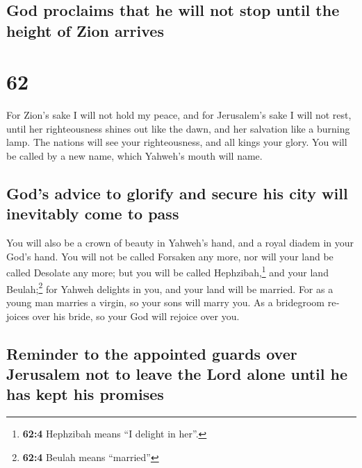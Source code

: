 \begin{paracol}{2}
\begin{otherlanguage}{english}
\hypertarget{god-proclaims-that-he-will-not-stop-until-the-height-of-zion-arrives}{%
\subsection{God proclaims that he will not stop until the height of Zion
arrives}\label{god-proclaims-that-he-will-not-stop-until-the-height-of-zion-arrives}}

\hypertarget{section-123}{%
\section{62}\label{section-123}}

 For Zion's sake I will not hold my peace, and for
Jerusalem's sake I will not rest, until her righteousness shines out
like the dawn, and her salvation like a burning lamp.  The
nations will see your righteousness, and all kings your glory. You will
be called by a new name, which Yahweh's mouth will name.

\hypertarget{gods-advice-to-glorify-and-secure-his-city-will-inevitably-come-to-pass}{%
\subsection{God's advice to glorify and secure his city will inevitably
come to
pass}\label{gods-advice-to-glorify-and-secure-his-city-will-inevitably-come-to-pass}}

 You will also be a crown of beauty in Yahweh's hand, and
a royal diadem in your God's hand.  You will not be called
Forsaken any more, nor will your land be called Desolate any more; but
you will be called Hephzibah,\footnote{\textbf{62:4} Hephzibah means ``I
  delight in her''.} and your land Beulah;\footnote{\textbf{62:4} Beulah
  means ``married''} for Yahweh delights in you, and your land will be
married.  For as a young man marries a virgin, so your
sons will marry you. As a bridegroom rejoices over his bride, so your
God will rejoice over you.

\hypertarget{reminder-to-the-appointed-guards-over-jerusalem-not-to-leave-the-lord-alone-until-he-has-kept-his-promises}{%
\subsection{Reminder to the appointed guards over Jerusalem not to leave
the Lord alone until he has kept his
promises}\label{reminder-to-the-appointed-guards-over-jerusalem-not-to-leave-the-lord-alone-until-he-has-kept-his-promises}}


\end{otherlanguage}
\end{paracol}
